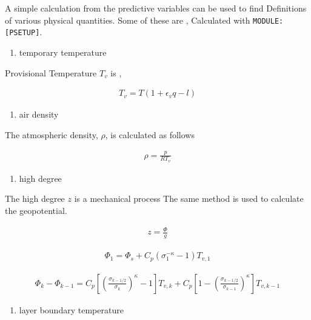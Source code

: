 A simple calculation from the predictive variables can be used to find
Definitions of various physical quantities. Some of these are ,
Calculated with \texttt{MODULE:{[}PSETUP{]}}.

\begin{enumerate}
\def\labelenumi{\arabic{enumi}.}
\tightlist
\item
  temporary temperature
\end{enumerate}

Provisional Temperature \(T_v\) is ,

\begin{eqnarray}
  T_v = T ( 1 + \epsilon_v q - l )
\end{eqnarray}

\begin{enumerate}
\def\labelenumi{\arabic{enumi}.}
\setcounter{enumi}{1}
\tightlist
\item
  air density
\end{enumerate}

The atmospheric density, \(\rho\), is calculated as follows

\begin{eqnarray}
  \rho = \frac{p}{RT_v}
\end{eqnarray}

\begin{enumerate}
\def\labelenumi{\arabic{enumi}.}
\setcounter{enumi}{2}
\tightlist
\item
  high degree
\end{enumerate}

The high degree \(z\) is a mechanical process The same method is used to
calculate the geopotential.

\begin{eqnarray}
  z = \frac{\Phi}{g}
\end{eqnarray}

\begin{eqnarray}
 \Phi_{1}  =  \Phi_{s} + C_{p} ( \sigma_{1}^{-\kappa} - 1  ) T_{v,1}
\end{eqnarray}

\begin{eqnarray}
 \Phi_k - \Phi_{k-1}
   =  C_{p}
   \left[ \left( \frac{ \sigma_{k-1/2} }{ \sigma_k } \right)^{\kappa}
          - 1 \right] T_{v,k}
       + C_{p}
   \left[ 1-
         \left( \frac{ \sigma_{k-1/2} }{ \sigma_{k-1} } \right)^{\kappa}
              \right] T_{v,k-1}
\end{eqnarray}

\begin{enumerate}
\def\labelenumi{\arabic{enumi}.}
\setcounter{enumi}{3}
\tightlist
\item
  layer boundary temperature
\end{enumerate}

